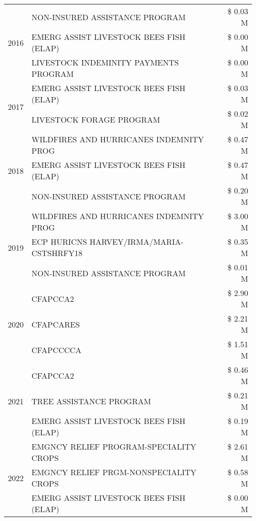 \begin{tabular}{llr}
\cline{1-3}
\multirow[t]{3}{*}{2016} & NON-INSURED ASSISTANCE PROGRAM & \$ 0.03 M \\
 & EMERG ASSIST LIVESTOCK BEES FISH (ELAP) & \$ 0.00 M \\
 & LIVESTOCK INDEMINITY PAYMENTS PROGRAM & \$ 0.00 M \\
\cline{1-3}
\multirow[t]{2}{*}{2017} & EMERG ASSIST LIVESTOCK BEES FISH (ELAP) & \$ 0.03 M \\
 & LIVESTOCK FORAGE PROGRAM & \$ 0.02 M \\
\cline{1-3}
\multirow[t]{3}{*}{2018} & WILDFIRES AND HURRICANES INDEMNITY PROG & \$ 0.47 M \\
 & EMERG ASSIST LIVESTOCK BEES FISH (ELAP) & \$ 0.47 M \\
 & NON-INSURED ASSISTANCE PROGRAM & \$ 0.20 M \\
\cline{1-3}
\multirow[t]{3}{*}{2019} & WILDFIRES AND HURRICANES INDEMNITY PROG & \$ 3.00 M \\
 & ECP HURICNS HARVEY/IRMA/MARIA-CSTSHRFY18 & \$ 0.35 M \\
 & NON-INSURED ASSISTANCE PROGRAM & \$ 0.01 M \\
\cline{1-3}
\multirow[t]{3}{*}{2020} & CFAPCCA2 & \$ 2.90 M \\
 & CFAPCARES & \$ 2.21 M \\
 & CFAPCCCCA & \$ 1.51 M \\
\cline{1-3}
\multirow[t]{3}{*}{2021} & CFAPCCA2 & \$ 0.46 M \\
 & TREE ASSISTANCE PROGRAM & \$ 0.21 M \\
 & EMERG ASSIST LIVESTOCK BEES FISH (ELAP) & \$ 0.19 M \\
\cline{1-3}
\multirow[t]{3}{*}{2022} & EMGNCY RELIEF PROGRAM-SPECIALITY CROPS & \$ 2.61 M \\
 & EMGNCY RELIEF PRGM-NONSPECIALITY CROPS & \$ 0.58 M \\
 & EMERG ASSIST LIVESTOCK BEES FISH (ELAP) & \$ 0.00 M \\
\cline{1-3}
\bottomrule
\end{tabular}

